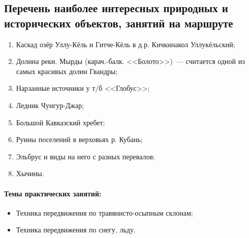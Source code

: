 \subsection{Перечень наиболее интересных природных и исторических объектов, занятий на маршруте}
\begin{enumerate}[noitemsep,topsep=0pt,parsep=0pt,partopsep=0pt]
	\item Каскад озёр Уллу-Кёль и Гитче-Кёль в д.р. Кичкинакол Уллукёльский; 
	\item Долина реки. Мырды (карач.-балк. <<Болото>>)~--- считается одной из самых красивых долин Гвандры; 
	\item Нарзанные источники у т/б <<Глобус>>; 
	\item Ледник Чунгур-Джар; 
	\item Большой Кавказский хребет; 
	\item Руины поселений в верховьях р. Кубань; 
	\item Эльбрус и виды на него с разных перевалов;
	\item Хычины.
\end{enumerate}

\paragraph{Темы практических занятий:}

\begin{itemize}
	\item Техника передвижения по травянисто-осыпным склонам;
	\item Техника передвижения по снегу, льду.
\end{itemize}

\newpage
